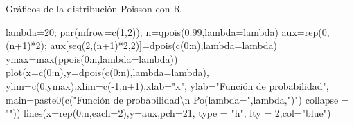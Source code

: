 \documentclass[
  ignorenonframetext,
  aspectratio=169]{beamer}
\newenvironment{Shaded}{\begin{snugshade}}{\end{snugshade}}
\newcommand{\AttributeTok}[1]{\textcolor[rgb]{0.40,0.45,0.13}{#1}}
\newcommand{\DecValTok}[1]{\textcolor[rgb]{0.68,0.00,0.00}{#1}}
\newcommand{\FloatTok}[1]{\textcolor[rgb]{0.68,0.00,0.00}{#1}}
\newcommand{\FunctionTok}[1]{\textcolor[rgb]{0.28,0.35,0.67}{#1}}
\newcommand{\NormalTok}[1]{\textcolor[rgb]{0.00,0.23,0.31}{#1}}
\newcommand{\OtherTok}[1]{\textcolor[rgb]{0.00,0.23,0.31}{#1}}
\newcommand{\SpecialCharTok}[1]{\textcolor[rgb]{0.37,0.37,0.37}{#1}}
\newcommand{\StringTok}[1]{\textcolor[rgb]{0.13,0.47,0.30}{#1}}
\begin{document}
\begin{frame}[fragile]{Gráficos de la distribución Poisson con R}
\protect\hypertarget{gruxe1ficos-de-la-distribuciuxf3n-poisson-con-r}{}
\begin{Shaded}
\begin{Highlighting}[]
\NormalTok{lambda}\OtherTok{=}\DecValTok{20}\NormalTok{; }\FunctionTok{par}\NormalTok{(}\AttributeTok{mfrow=}\FunctionTok{c}\NormalTok{(}\DecValTok{1}\NormalTok{,}\DecValTok{2}\NormalTok{)); n}\OtherTok{=}\FunctionTok{qpois}\NormalTok{(}\FloatTok{0.99}\NormalTok{,}\AttributeTok{lambda=}\NormalTok{lambda)}
\NormalTok{aux}\OtherTok{=}\FunctionTok{rep}\NormalTok{(}\DecValTok{0}\NormalTok{,(n}\SpecialCharTok{+}\DecValTok{1}\NormalTok{)}\SpecialCharTok{*}\DecValTok{2}\NormalTok{); aux[}\FunctionTok{seq}\NormalTok{(}\DecValTok{2}\NormalTok{,(n}\SpecialCharTok{+}\DecValTok{1}\NormalTok{)}\SpecialCharTok{*}\DecValTok{2}\NormalTok{,}\DecValTok{2}\NormalTok{)]}\OtherTok{=}\FunctionTok{dpois}\NormalTok{(}\FunctionTok{c}\NormalTok{(}\DecValTok{0}\SpecialCharTok{:}\NormalTok{n),}\AttributeTok{lambda=}\NormalTok{lambda)}
\NormalTok{ymax}\OtherTok{=}\FunctionTok{max}\NormalTok{(}\FunctionTok{ppois}\NormalTok{(}\DecValTok{0}\SpecialCharTok{:}\NormalTok{n,}\AttributeTok{lambda=}\NormalTok{lambda)) }
\FunctionTok{plot}\NormalTok{(}\AttributeTok{x=}\FunctionTok{c}\NormalTok{(}\DecValTok{0}\SpecialCharTok{:}\NormalTok{n),}\AttributeTok{y=}\FunctionTok{dpois}\NormalTok{(}\FunctionTok{c}\NormalTok{(}\DecValTok{0}\SpecialCharTok{:}\NormalTok{n),}\AttributeTok{lambda=}\NormalTok{lambda),}
     \AttributeTok{ylim=}\FunctionTok{c}\NormalTok{(}\DecValTok{0}\NormalTok{,ymax),}\AttributeTok{xlim=}\FunctionTok{c}\NormalTok{(}\SpecialCharTok{{-}}\DecValTok{1}\NormalTok{,n}\SpecialCharTok{+}\DecValTok{1}\NormalTok{),}\AttributeTok{xlab=}\StringTok{"x"}\NormalTok{, }\AttributeTok{ylab=}\StringTok{"Función de probabilidad"}\NormalTok{,}
     \AttributeTok{main=}\FunctionTok{paste0}\NormalTok{(}\FunctionTok{c}\NormalTok{(}\StringTok{"Función de probabilidad}\SpecialCharTok{\textbackslash{}n}\StringTok{  Po(lambda="}\NormalTok{,lambda,}\StringTok{")"}\NormalTok{)}
                 \AttributeTok{collapse =} \StringTok{""}\NormalTok{))}
\FunctionTok{lines}\NormalTok{(}\AttributeTok{x=}\FunctionTok{rep}\NormalTok{(}\DecValTok{0}\SpecialCharTok{:}\NormalTok{n,}\AttributeTok{each=}\DecValTok{2}\NormalTok{),}\AttributeTok{y=}\NormalTok{aux,}\AttributeTok{pch=}\DecValTok{21}\NormalTok{, }\AttributeTok{type =} \StringTok{"h"}\NormalTok{, }\AttributeTok{lty =} \DecValTok{2}\NormalTok{,}\AttributeTok{col=}\StringTok{"blue"}\NormalTok{)}

\end{Highlighting}
\end{Shaded}
\end{frame}
\end{document}
